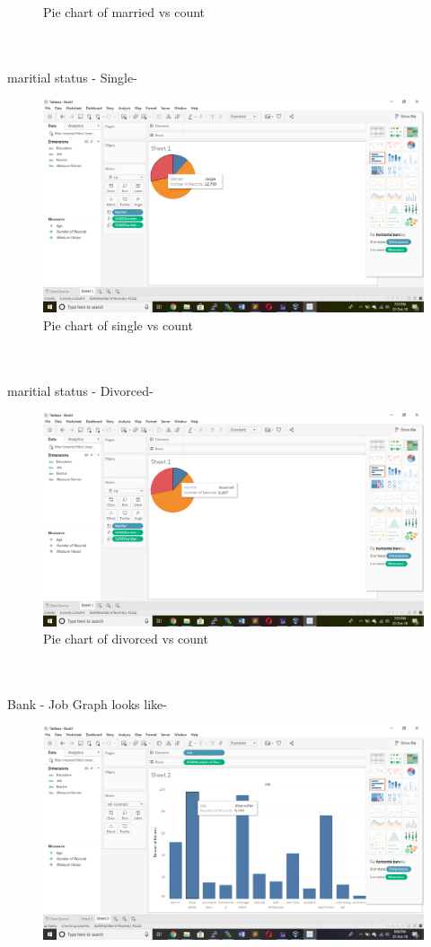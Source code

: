 \begin{itemize}
\begin{figure}[h!]
	\caption{Pie chart of married vs count}
\end{figure}
%
\\
\\
maritial status - Single-
\begin{figure}[h!]
	\centering
	\includegraphics[width=\linewidth]{sc3.png}
	\caption{Pie chart of single vs count}
\end{figure}
\\
\\
maritial status - Divorced-
\begin{figure}[h!]
	\centering
	\includegraphics[width=\linewidth]{sc4.png}
	\caption{Pie chart of divorced vs count}
\end{figure}
\\
\\
Bank - Job Graph looks like-
\begin{figure}[h!]
	\centering
	\includegraphics[width=\linewidth]{sc6.png}

\end{figure}
\end{itemize}
